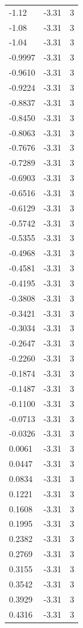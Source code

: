 \begin{longtable}{lrr}
  -1.12 & -3.31 & 3 \\
  -1.08 & -3.31 & 3 \\
  -1.04 & -3.31 & 3 \\
  -0.9997 & -3.31 & 3 \\
  -0.9610 & -3.31 & 3 \\
  -0.9224 & -3.31 & 3 \\
  -0.8837 & -3.31 & 3 \\
  -0.8450 & -3.31 & 3 \\
  -0.8063 & -3.31 & 3 \\
  -0.7676 & -3.31 & 3 \\
  -0.7289 & -3.31 & 3 \\
  -0.6903 & -3.31 & 3 \\
  -0.6516 & -3.31 & 3 \\
  -0.6129 & -3.31 & 3 \\
  -0.5742 & -3.31 & 3 \\
  -0.5355 & -3.31 & 3 \\
  -0.4968 & -3.31 & 3 \\
  -0.4581 & -3.31 & 3 \\
  -0.4195 & -3.31 & 3 \\
  -0.3808 & -3.31 & 3 \\
  -0.3421 & -3.31 & 3 \\
  -0.3034 & -3.31 & 3 \\
  -0.2647 & -3.31 & 3 \\
  -0.2260 & -3.31 & 3 \\
  -0.1874 & -3.31 & 3 \\
  -0.1487 & -3.31 & 3 \\
  -0.1100 & -3.31 & 3 \\
  -0.0713 & -3.31 & 3 \\
  -0.0326 & -3.31 & 3 \\
  0.0061 & -3.31 & 3 \\
  0.0447 & -3.31 & 3 \\
  0.0834 & -3.31 & 3 \\
  0.1221 & -3.31 & 3 \\
  0.1608 & -3.31 & 3 \\
  0.1995 & -3.31 & 3 \\
  0.2382 & -3.31 & 3 \\
  0.2769 & -3.31 & 3 \\
  0.3155 & -3.31 & 3 \\
  0.3542 & -3.31 & 3 \\
  0.3929 & -3.31 & 3 \\
  0.4316 & -3.31 & 3 \\

\end{longtable}
